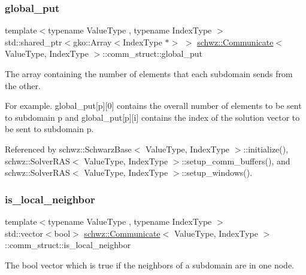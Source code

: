 \subsubsection{\texorpdfstring{global\+\_\+put}{global\_put}}
{\footnotesize\ttfamily template$<$typename Value\+Type , typename Index\+Type $>$ \\
std\+::shared\+\_\+ptr$<$gko\+::\+Array$<$Index\+Type $\ast$$>$ $>$ \hyperlink{classschwz_1_1Communicate}{schwz\+::\+Communicate}$<$ Value\+Type, Index\+Type $>$\+::comm\+\_\+struct\+::global\+\_\+put}



The array containing the number of elements that each subdomain sends from the other. 

For example. global\+\_\+put\mbox{[}p\mbox{]}\mbox{[}0\mbox{]} contains the overall number of elements to be sent to subdomain p and global\+\_\+put\mbox{[}p\mbox{]}\mbox{[}i\mbox{]} contains the index of the solution vector to be sent to subdomain p. 

Referenced by schwz\+::\+Schwarz\+Base$<$ Value\+Type, Index\+Type $>$\+::initialize(), schwz\+::\+Solver\+R\+A\+S$<$ Value\+Type, Index\+Type $>$\+::setup\+\_\+comm\+\_\+buffers(), and schwz\+::\+Solver\+R\+A\+S$<$ Value\+Type, Index\+Type $>$\+::setup\+\_\+windows().

\mbox{\label{structschwz_1_1Communicate_1_1comm__struct_a66536e858c43c5ebbba8bd3fb4b5e888}} 
\subsubsection{\texorpdfstring{is\+\_\+local\+\_\+neighbor}{is\_local\_neighbor}}
{\footnotesize\ttfamily template$<$typename Value\+Type , typename Index\+Type $>$ \\
std\+::vector$<$bool$>$ \hyperlink{classschwz_1_1Communicate}{schwz\+::\+Communicate}$<$ Value\+Type, Index\+Type $>$\+::comm\+\_\+struct\+::is\+\_\+local\+\_\+neighbor}



The bool vector which is true if the neighbors of a subdomain are in one node. 



